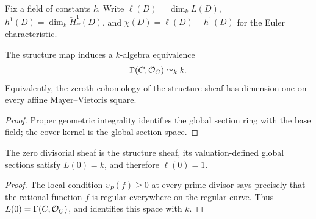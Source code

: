 \begin{definition}
  \label{def:adelic_chi_ledger}
  \leanok
  Fix a field of constants \(k\). Write \(\ell(D) = \dim_k L(D)\),
  \(h^1(D) = \dim_k \check{H}^1_{\mathrm{ff}}(D)\), and
  \(\chi(D) = \ell(D) - h^1(D)\)
  for the Euler characteristic.
\end{definition}

\begin{theorem}
  \label{thm:adelic_global_sections_constants}
  \leanok
  The structure map induces a \(k\)-algebra equivalence
  \[
    \Gamma(C,\mathcal{O}_{C})\simeq_k k.
  \]
  Equivalently, the zeroth cohomology of the structure sheaf has dimension
  one on every affine Mayer--Vietoris square.
\end{theorem}
\begin{proof}
  \leanok
  Proper geometric integrality identifies the global section ring with the
  base field; the cover kernel is the global section space.
\end{proof}

\begin{corollary}
  \label{thm:adelic_ell_zero}
  The zero divisorial sheaf is the structure sheaf, its valuation-defined
  global sections satisfy \(L(0)=k\), and therefore \(\ell(0)=1\).
\end{corollary}
\begin{proof}
  The local condition \(v_P(f)\ge0\) at every prime divisor says precisely
  that the rational function \(f\) is regular everywhere on the regular
  curve.  Thus \(L(0)=\Gamma(C,\mathcal{O}_{C})\), and
   identifies this space with
  \(k\).
\end{proof}

